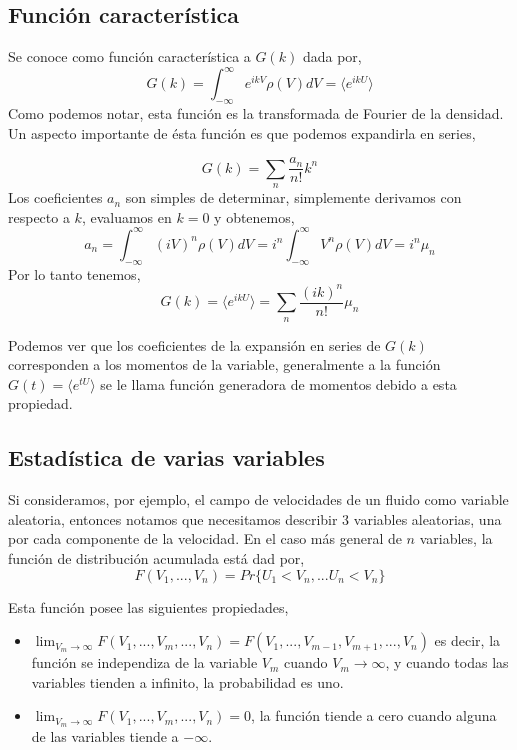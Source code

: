 \documentclass[executivepaper,12pt]{article}
\numberwithin{equation}{section}
\begin{document}
 \subsection{Función característica}
 
 Se conoce como función característica a $G(k)$ dada por,
 \begin{equation}
 	G(k)=\int_{-\infty}^{\infty} e^{ikV} \rho(V)dV=\langle e^{ikU}\rangle
 \end{equation}
 Como podemos notar, esta función es la transformada de Fourier de la densidad. Un aspecto importante de ésta función es que podemos expandirla en series,
 
 \begin{equation*}
 	G(k)=\sum_n \frac{a_n}{n!} k^n
 \end{equation*}
 Los coeficientes $a_n$ son simples de determinar, simplemente derivamos con respecto a $k$, evaluamos en $k=0$ y obtenemos,
 \begin{equation*}
 	a_n=\int_{-\infty}^{\infty}(iV)^n\rho(V)dV=i^n\int_{-\infty}^{\infty}V^n\rho(V)dV=i^n \mu_n
 \end{equation*}
 Por lo tanto tenemos,
 \begin{equation}
 	G(k)=\langle e^{ikU}\rangle= \sum_n \frac{(ik)^n}{n!} \mu_n
 \end{equation}
 
Podemos ver que los coeficientes de la expansión en series de $G(k)$ corresponden a los momentos de la variable, generalmente a la función $G(t)=\langle e^{tU}\rangle$ se le llama función generadora de momentos debido a esta propiedad. 

\subsection{Estadística de varias variables}

Si consideramos, por ejemplo, el campo de velocidades de un fluido como variable aleatoria, entonces notamos que necesitamos describir 3 variables aleatorias, una por cada componente de la velocidad. En el caso más general de $n$ variables, la función de distribución acumulada está dad por,
\begin{equation*}
	F(V_1,...,V_n)=Pr\{U_1<V_n,...U_n<V_n\}
\end{equation*}  

Esta función posee las siguientes propiedades,

\begin{itemize}
	\item $\lim_{V_m\to\infty} F(V_1,...,V_m,...,V_n)=F(V_1,...,V_{m-1},V_{m+1},...,V_n)$ es decir, la función se independiza de la variable $V_m$ cuando $V_m\to\infty$, y cuando todas las variables tienden a infinito, la probabilidad es uno.
	\item  $\lim_{V_m\to\infty} F(V_1,...,V_m,...,V_n)=0$, la función tiende a cero cuando alguna de las variables tiende a $-\infty$.  
\end{itemize}
\end{document}

